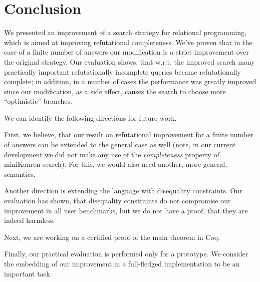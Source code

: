 \section{Conclusion}
\label{sec:conclusion}

We presented an improvement of a search strategy for relational programming, which is aimed at
improving refutational completeness. We've proven that in the case of a finite number of 
answers our modification is a strict improvement over the original strategy. Our evaluation 
shows, that w.r.t. the improved search many practically important refutationally incomplete 
queries became refutationally complete; in addition, in a number of cases the performance was greatly 
improved since our modification, as a side effect, causes the search to choose more 
``optimistic'' branches.

We can identify the following directions for future work. 

First, we believe, that our result on refutational improvement for a finite number of answers 
can be extended to the general case as well (note, in our current development we did not make 
any use of the \emph{completeness} property of miniKanren search). For this, we would also need 
another, more general, semantics. 

Another direction is extending the language with disequality constraints. Our evaluation has 
shown, that disequality constraints do not compromise our improvement in all user benchmarks, 
but we do not have a proof, that they are indeed harmless.

Next, we are working on a certified proof of the main theorem in Coq.

Finally, our practical evaluation is performed only for a prototype. 
We consider the embedding of our improvement in a full-fledged implementation to be
an important task.
